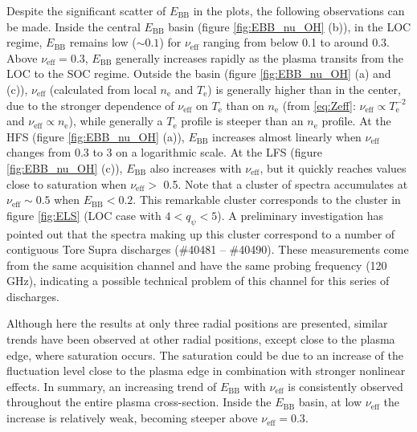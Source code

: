 Despite the significant scatter of $E_\mathrm{BB}$ in the plots, the following observations can be made. Inside the central $E_\mathrm{BB}$ basin (figure \ref{fig:EBB_nu_OH} (b)), in the LOC regime, $E_\mathrm{BB}$ remains low ($\sim 0.1$) for $\nu_\mathrm{eff}$ ranging from below 0.1 to around 0.3. Above $\nu_\mathrm{eff} = 0.3$, $E_\mathrm{BB}$ generally increases rapidly as the plasma transits from the LOC to the SOC regime. Outside the basin (figure \ref{fig:EBB_nu_OH} (a) and (c)), $\nu_\mathrm{eff}$ (calculated from local $n_\mathrm{e}$ and $T_\mathrm{e}$) is generally higher than in the center, due to the stronger dependence of $\nu_\mathrm{eff}$ on $T_\mathrm{e}$ than on $n_\mathrm{e}$ (from \eqref{eq:Zeff}: $\nu_\mathrm{eff} \propto T_\mathrm{e}^{-2}$ and $\nu_\mathrm{eff}\propto n_\mathrm{e}$), while generally a $T_\mathrm{e}$ profile is steeper than an $n_\mathrm{e}$ profile. At the HFS (figure \ref{fig:EBB_nu_OH} (a)), $E_\mathrm{BB}$ increases almost linearly when $\nu_\mathrm{eff}$ changes from 0.3 to 3 on a logarithmic scale. At the LFS (figure \ref{fig:EBB_nu_OH} (c)), $E_\mathrm{BB}$ also increases with $\nu_\mathrm{eff}$, but it quickly reaches values close to saturation when $\nu_\mathrm{eff} > $ 0.5. Note that a cluster of spectra accumulates at $\nu_\mathrm{eff} \sim 0.5$ when $E_\mathrm{BB} < 0.2$. This remarkable cluster corresponds to the cluster in figure \ref{fig:ELS} (LOC case with $4 < q_{\psi} < 5$). A preliminary investigation has pointed out that the spectra making up this cluster correspond to a number of contiguous Tore Supra discharges (\#40481 -- \#40490). These measurements come from the same acquisition channel and have the same probing frequency (120 GHz), indicating a possible technical problem of this channel for this series of discharges.


Although here the results at only three radial positions are presented, similar trends have been observed at other radial positions, except close to the plasma edge, where saturation occurs. The saturation could be due to an increase of the fluctuation level close to the plasma edge in combination with stronger nonlinear effects. In summary, an increasing trend of $E_\mathrm{BB}$ with $\nu_\mathrm{eff}$ is consistently observed throughout the entire plasma cross-section. Inside the $E_\mathrm{BB}$ basin, at low $\nu_\mathrm{eff}$ the increase is relatively weak, becoming steeper above $\nu_\mathrm{eff} = 0.3$.



